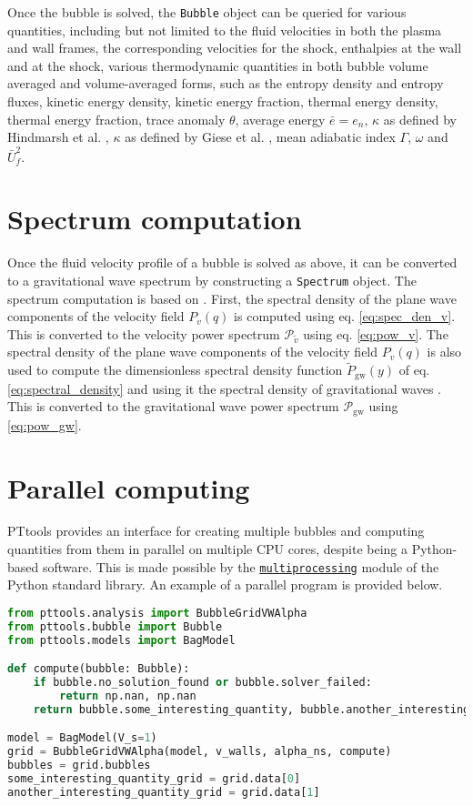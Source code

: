 Once the bubble is solved, the \verb|Bubble| object can be queried for various quantities,
including but not limited to the fluid velocities in both the plasma and wall frames,
the corresponding velocities for the shock,
enthalpies at the wall and at the shock,
various thermodynamic quantities in both bubble volume averaged and volume-averaged forms,
such as the entropy density and entropy fluxes,
kinetic energy density,
kinetic energy fraction,
thermal energy density,
thermal energy fraction,
trace anomaly $\theta$,
average energy $\bar{e} = e_n$,
$\kappa$ as defined by Hindmarsh et al. ,
$\kappa$ as defined by Giese et al. ,
mean adiabatic index $\Gamma$,
$\omega$ and
$\bar{U}_f^2$.


\section{Spectrum computation}
Once the fluid velocity profile of a bubble is solved as above,
it can be converted to a gravitational wave spectrum by constructing a \verb|Spectrum| object.
The spectrum computation is based on \cite{hindmarsh_gw_pt_2019}.
First, the spectral density of the plane wave components of the velocity field $P_v(q)$ is computed using eq. \eqref{eq:spec_den_v}.
This is converted to the velocity power spectrum $\mathcal{P}_{\tilde{v}}$ using eq. \eqref{eq:pow_v}.
The spectral density of the plane wave components of the velocity field $P_v(q)$ is also used to compute the dimensionless spectral density function $\tilde{P}_{\text{gw}}(y)$ of eq. \eqref{eq:spectral_density} and using it the spectral density of gravitational waves .
This is converted to the gravitational wave power spectrum $\mathcal{P}_{\text{gw}}$ using \eqref{eq:pow_gw}.


\section{Parallel computing}
PTtools provides an interface for creating multiple bubbles and computing quantities from them in parallel on multiple CPU cores,
despite being a Python-based software.
This is made possible by the
\href{https://docs.python.org/3/library/multiprocessing.html}{\texttt{multiprocessing}}
module of the Python standard library.
An example of a parallel program is provided below.

\begin{lstlisting}[language=Python]
from pttools.analysis import BubbleGridVWAlpha
from pttools.bubble import Bubble
from pttools.models import BagModel

def compute(bubble: Bubble):
	if bubble.no_solution_found or bubble.solver_failed:
		return np.nan, np.nan
	return bubble.some_interesting_quantity, bubble.another_interesting_quantity

model = BagModel(V_s=1)
grid = BubbleGridVWAlpha(model, v_walls, alpha_ns, compute)
bubbles = grid.bubbles
some_interesting_quantity_grid = grid.data[0]
another_interesting_quantity_grid = grid.data[1]
\end{lstlisting}



